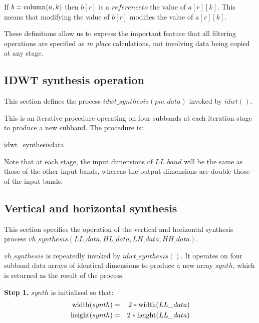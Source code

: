 If $b=\operatorname{column}(a,k)$ then $b[r]$ is a $reference to$ the value of $a[r][k]$. This means that modifying the
value of $b[r]$ modifies the value of $a[r][k]$.

\begin{informative}
These definitions allow us to express the important feature that all filtering operations are specified
as {\em in place} calculations, not involving data being copied at any stage.
\end{informative}

\subsection{IDWT synthesis operation}
\label{idwtsynthesis}

This section defines the process $idwt\_synthesis(pic, data)$ invoked by $idwt()$.

This is an iterative procedure operating on four subbands at each
iteration stage to produce a new subband. The procedure
is:

\begin{pseudo}{idwt\_synthesis}{data}
\bsEND
{}
\end{pseudo}

Note that at each stage, the input dimensions of $LL\_band$ will be the same as those of the
other input bands, whereas the output dimensions are double those of the input bands.

\subsection{Vertical and horizontal synthesis}
\label{vhsynth}

This section specifies the operation of the vertical and horizontal
synthesis process $vh\_synthesis(LL\_data, HL\_data, LH\_data, HH\_data)$.

$vh\_synthesis$ is repeatedly invoked by $idwt\_synthesis()$. It operates on four subband
data arrays of identical dimensions to produce a new array $synth$, which is returned as the result of
the process.

{\bf Step 1.} $synth$ is initialised so that:
\begin{eqnarray*}
\operatorname{width}(synth) & = & 2*\operatorname{width}(LL\_data) \\
\operatorname{height}(synth) & = & 2*\operatorname{height}(LL\_data)
\end{eqnarray*}

